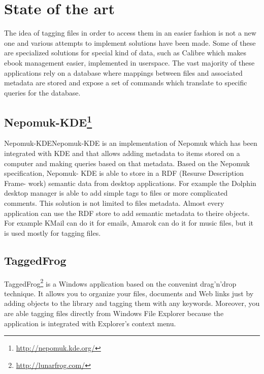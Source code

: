 


\section{State of the art}

The idea of tagging files in order to access them in an easier fashion is not
a new one and various attempts to implement solutions have been made. Some of
these are specialized solutions for special kind of data, such as Calibre
which makes ebook management easier, implemented in userspace. The vast majority
of these applications rely on a database where mappings between files and 
associated metadata are stored and expose a set of commands which translate
to specific queries for the database.  

\subsection[Nepomuk-KDE]{Nepomuk-KDE\footnote{\url{http://nepomuk.kde.org/}}}
Nepomuk-KDENepomuk-KDE is an implementation of Nepomuk which
has been integrated with KDE and that allows adding metadata
to items stored on a computer and making queries based on
that metadata. Based on the Nepomuk specification, Nepomuk-
KDE is able to store in a RDF (Resurse Description Frame-
work) semantic data from desktop applications. For example
the Dolphin desktop manager is able to add simple tags to ﬁles
or more complicated comments. This solution is not limited
to files metadata. Almost every application can use the RDF
store to add semantic metadata to theire objects. For example
KMail can do it for emails, Amarok can do it for music ﬁles,
but it is used mostly for tagging ﬁles.


\subsection{TaggedFrog}TaggedFrog\footnote{ \url{http://lunarfrog.com/}} is a Windows application 
based on the convenint drag'n'drop technique. It allows you to organize your files, 
documents and Web links just by adding objects to the library and tagging them with 
any keywords. Moreover, you are able tagging files directly from Windows File Explorer 
because the application is integrated with Explorer's context menu.

